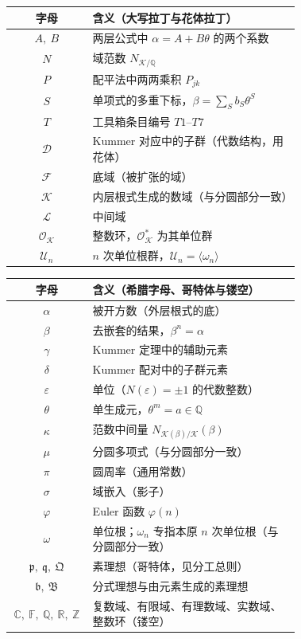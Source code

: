 \documentclass[UTF8,a4paper,11pt]{ctexart}
\begin{document}
\begin{center}
\begin{tabular}{c|>{\raggedright\arraybackslash}p{0.72\linewidth}}
\toprule
字母 & 含义（大写拉丁与花体拉丁） \\
\midrule
$A,\ B$ & 两层公式中 $\alpha=A+B\theta$ 的两个系数 \\
$N$ & 域范数 $N_{\mathscr{K}/\mathbb{Q}}$ \\
$P$ & 配平法中两两乘积 $P_{jk}$ \\
$S$ & 单项式的多重下标，$\beta=\sum_S b_S\theta^S$ \\
$T$ & 工具箱条目编号 $T1$–$T7$ \\
$\mathscr{D}$ & Kummer 对应中的子群（代数结构，用花体） \\
$\mathscr{F}$ & 底域（被扩张的域） \\
$\mathscr{K}$ & 内层根式生成的数域（与分圆部分一致） \\
$\mathscr{L}$ & 中间域 \\
$\mathscr{O}_{\mathscr{K}}$ & 整数环，$\mathscr{O}_{\mathscr{K}}^*$ 为其单位群 \\
$\mathscr{U}_n$ & $n$ 次单位根群，$\mathscr{U}_n=\langle\omega_n\rangle$ \\
\bottomrule
\end{tabular}
\end{center}

\begin{center}
\begin{tabular}{c|>{\raggedright\arraybackslash}p{0.72\linewidth}}
\toprule
字母 & 含义（希腊字母、哥特体与镂空） \\
\midrule
$\alpha$ & 被开方数（外层根式的底） \\
$\beta$ & 去嵌套的结果，$\beta^n=\alpha$ \\
$\gamma$ & Kummer 定理中的辅助元素 \\
$\delta$ & Kummer 配对中的子群元素 \\
$\varepsilon$ & 单位（$N(\varepsilon)=\pm1$ 的代数整数） \\
$\theta$ & 单生成元，$\theta^m=a\in\mathbb{Q}$ \\
$\kappa$ & 范数中间量 $N_{\mathscr{K}(\beta)/\mathscr{K}}(\beta)$ \\
$\mu$ & 分圆多项式（与分圆部分一致） \\
$\pi$ & 圆周率（通用常数） \\
$\sigma$ & 域嵌入（影子） \\
$\varphi$ & Euler 函数 $\varphi(n)$ \\
$\omega$ & 单位根；$\omega_n$ 专指本原 $n$ 次单位根（与分圆部分一致） \\
$\mathfrak{p},\ \mathfrak{q},\ \mathfrak{Q}$ & 素理想（哥特体，见分工总则） \\
$\mathfrak{b},\ \mathfrak{B}$ & 分式理想与由元素生成的素理想 \\
$\mathbb{C},\ \mathbb{F},\ \mathbb{Q},\ \mathbb{R},\ \mathbb{Z}$ & 复数域、有限域、有理数域、实数域、整数环（镂空） \\
\bottomrule
\end{tabular}
\end{center}
\end{document}
